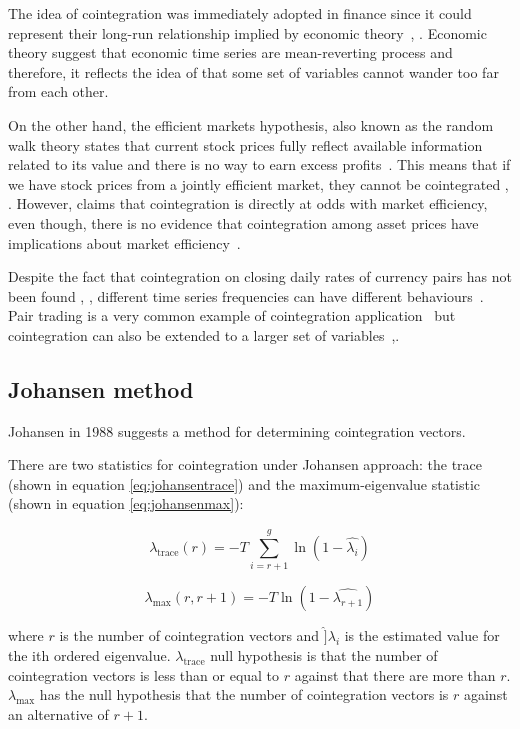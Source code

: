 The idea of cointegration was immediately adopted in finance since it could
represent their long-run relationship implied by economic
theory~\cite{laietAl1991}, \cite{lence+falk2005}.  Economic theory suggest that
economic time series are mean-reverting process and therefore, it reflects the
idea of that some set of variables cannot wander too far from each other. 

On the other hand, the efficient markets hypothesis, also known as the random
walk theory states that current stock prices fully reflect available information
related to its value and there is no way to earn excess profits~\cite{fama1970}.
This means that if we have stock prices from a jointly efficient market, they
cannot be cointegrated \cite{granger1986}, \cite{dwyer1992}. However,
\cite{richards1995} claims that cointegration is directly at odds with market
efficiency, even though, there is no evidence that cointegration among asset
prices have implications about market efficiency~\cite{lence+falk2005}.

Despite the fact that cointegration on closing daily rates of currency pairs has
not been found \cite{coleman1990}, \cite{copeland1991}, different time series
frequencies can have different behaviours~\cite{aldridge2009}. Pair trading is a
very common example of cointegration application~\cite{herlemont2003} but
cointegration can also be extended to a larger set of
variables~\cite{mukherjee1995},\cite{engle2004}.

\subsection{Johansen method}
Johansen in 1988 \cite{johansen1988} suggests a method for determining
cointegration vectors. 

There are two statistics for cointegration under Johansen approach: the trace
(shown in equation \ref{eq:johansentrace}) and the maximum-eigenvalue statistic
(shown in equation \ref{eq:johansenmax}):

\begin{equation}
\label{eq:johansentrace}
\lambda_{\text{trace}} (r) = -T \sum_{i=r+1}^g \ln(1-\hat{\lambda_i})
\end{equation}


\begin{equation}
\label{eq:johansenmax}
\lambda_{\text{max}} (r,r+1) = -T \ln(1-\hat{\lambda_{r+1}})
\end{equation}


\noindent where $r$ is the number of cointegration vectors and
$\hat]{\lambda}_i$ is the estimated value for the ith ordered eigenvalue.
$\lambda_{\text{trace}}$ null hypothesis is that the number of cointegration
vectors is less than or equal to $r$ against that there are more than $r$.
$\lambda_{\text{max}}$ has the null hypothesis that the number of cointegration
vectors is $r$ against an alternative of $r +1$.

